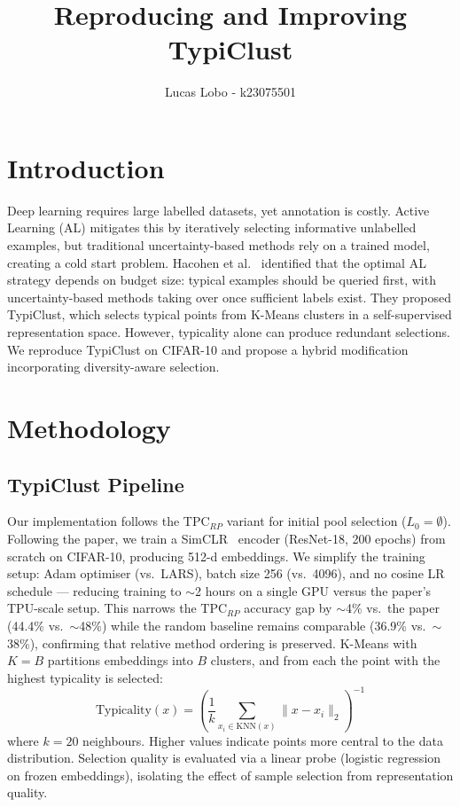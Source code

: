 \documentclass[10pt, twocolumn]{article}
\title{\vspace{-1.5cm}Reproducing and Improving TypiClust\vspace{-0.5cm}}
\author{Lucas Lobo - k23075501}
\date{}
\begin{document}
\maketitle
\vspace{-0.8cm}

\section{Introduction}
Deep learning requires large labelled datasets, yet annotation is costly. Active Learning (AL) mitigates this by iteratively selecting informative unlabelled examples, but traditional uncertainty-based methods rely on a trained model, creating a cold start problem. Hacohen et al.~\cite{hacohen2022active} identified that the optimal AL strategy depends on budget size: typical examples should be queried first, with 
  uncertainty-based methods taking over once sufficient labels exist. They proposed TypiClust, which selects typical points from K-Means clusters in a self-supervised representation space. However, typicality alone can produce redundant selections. We reproduce TypiClust on CIFAR-10 and propose a hybrid modification incorporating diversity-aware selection.

\section{Methodology}

\subsection{TypiClust Pipeline}

Our implementation follows the TPC$_{RP}$ variant for initial pool selection ($L_0 = \emptyset$). Following the paper, we train a SimCLR~\cite{chen2020simple} encoder (ResNet-18, 200 epochs) from scratch on CIFAR-10, producing 512-d embeddings. We simplify the training setup: Adam optimiser (vs.\ LARS), batch size 256 (vs.\ 4096), and no cosine LR schedule --- reducing training to $\sim$2 hours on a single GPU versus the paper's TPU-scale setup. This narrows the TPC$_{RP}$ accuracy gap by $\sim$4\% vs.\ the paper (44.4\% vs.\ $\sim$48\%) while the random baseline remains comparable (36.9\% vs.\ $\sim$38\%), confirming that relative method ordering is preserved. K-Means with $K = B$ partitions embeddings into $B$ clusters, and from each the point with the highest typicality is selected:
\begin{equation}
    \text{Typicality}(x) = \left(\frac{1}{k}\sum_{x_i \in \text{KNN}(x)} \|x - x_i\|_2\right)^{-1}
\end{equation}
where $k = 20$ neighbours. Higher values indicate points more central to the data distribution. Selection quality is evaluated via a linear probe (logistic regression on frozen embeddings), isolating the effect of sample selection from representation quality.
\end{document}
